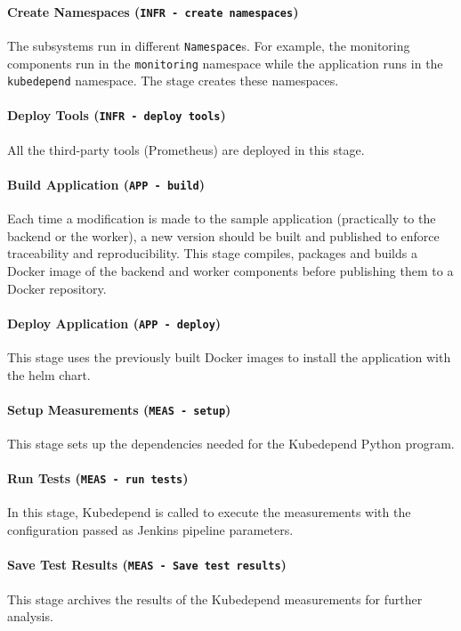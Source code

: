 \paragraph{Create Namespaces (\texttt{INFR - create namespaces})} The subsystems run in different \texttt{Namespace}s. For example, the monitoring components run in the \texttt{monitoring} namespace while the application runs in the \texttt{kubedepend} namespace. The stage creates these namespaces.

\paragraph{Deploy Tools (\texttt{INFR - deploy tools})} All the third-party tools (\eg Prometheus) are deployed in this stage.

\paragraph{Build Application (\texttt{APP - build})} Each time a modification is made to the sample application (practically to the backend or the worker), a new version should be built and published to enforce traceability and reproducibility. This stage compiles, packages and builds a Docker image of the backend and worker components before publishing them to a Docker repository.

\paragraph{Deploy Application (\texttt{APP - deploy})} This stage uses the previously built Docker images to install the application with the helm chart.

\paragraph{Setup Measurements (\texttt{MEAS - setup})} This stage sets up the dependencies needed for the Kubedepend Python program.

\paragraph{Run Tests (\texttt{MEAS - run tests})} In this stage, Kubedepend is called to execute the measurements with the configuration passed as Jenkins pipeline parameters.

\paragraph{Save Test Results (\texttt{MEAS - Save test results})} This stage archives the results of the Kubedepend measurements for further analysis.

